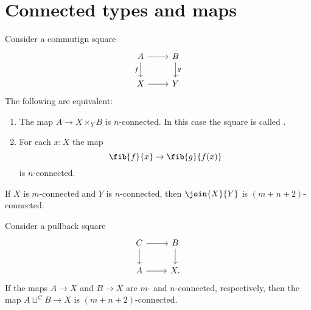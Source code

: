 \chapter{Connected types and maps}

\begin{thm}
Consider a commutign square
\begin{equation*}
\begin{tikzcd}
A \arrow[d,swap,"f"] \arrow[r] & B \arrow[d,"g"] \\
X \arrow[r] & Y
\end{tikzcd}
\end{equation*}
The following are equivalent:
\begin{enumerate}
\item The map $A\to X\times_Y B$ is $n$-connected. In this case the square is called .
\item For each $x:X$ the map
\begin{equation*}
\fib{f}{x}\to \fib{g}{f(x)}
\end{equation*}
is $n$-connected.
\end{enumerate}
\end{thm}

\begin{thm}
If $X$ is $m$-connected and $Y$ is $n$-connected, then $\join{X}{Y}$ is $(m+n+2)$-connected. 
\end{thm}

\begin{thm}
Consider a pullback square
\begin{equation*}
\begin{tikzcd}
C \arrow[r] \arrow[d] & B \arrow[d] \\
A \arrow[r] & X.
\end{tikzcd}
\end{equation*}
If the maps $A\to X$ and $B\to X$ are $m$- and $n$-connected, respectively, then the map $A\sqcup^C B\to X$ is $(m+n+2)$-connected.
\end{thm}

